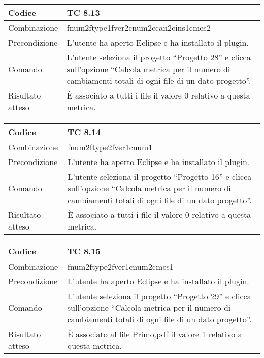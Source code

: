 \begin{table}[ht]
\begin{tabular}{|p{3cm}|p{9cm}|}
\hline
\cellcolor{lightgray}Codice				& TC 8.13								\\
\hline
\cellcolor{lightgray}Combinazione		& fnum2ftype1fver2cnum2ccan2cins1cmes2									\\
\hline
\cellcolor{lightgray}Precondizione		& L'utente ha aperto Eclipse e ha installato il plugin.		\\
\hline
\cellcolor{lightgray}Comando			& L'utente seleziona il progetto ``Progetto 28''  e clicca sull'opzione ``Calcola metrica per il numero di cambiamenti totali di ogni file di un dato progetto''.	\\
\hline
\cellcolor{lightgray}Risultato atteso	& È associato a tutti i file il valore 0 relativo a questa metrica.\\
\hline
\end{tabular}
\end{table}

\begin{table}[ht]
\begin{tabular}{|p{3cm}|p{9cm}|}
\hline
\cellcolor{lightgray}Codice				& TC 8.14								\\
\hline
\cellcolor{lightgray}Combinazione		& fnum2ftype2fver1cnum1									\\
\hline
\cellcolor{lightgray}Precondizione		& L'utente ha aperto Eclipse e ha installato il plugin.		\\
\hline
\cellcolor{lightgray}Comando			& L'utente seleziona il progetto ``Progetto 16''  e clicca sull'opzione ``Calcola metrica per il numero di cambiamenti totali di ogni file di un dato progetto''.	\\
\hline
\cellcolor{lightgray}Risultato atteso	& È associato a tutti i file il valore 0 relativo a questa metrica.\\
\hline
\end{tabular}
\end{table}

\begin{table}[ht]
\begin{tabular}{|p{3cm}|p{9cm}|}
\hline
\cellcolor{lightgray}Codice				& TC 8.15								\\
\hline
\cellcolor{lightgray}Combinazione		& fnum2ftype2fver1cnum2cmes1									\\
\hline
\cellcolor{lightgray}Precondizione		& L'utente ha aperto Eclipse e ha installato il plugin.		\\
\hline
\cellcolor{lightgray}Comando			& L'utente seleziona il progetto ``Progetto 29''  e clicca sull'opzione ``Calcola metrica per il numero di cambiamenti totali di ogni file di un dato progetto''.	\\
\hline
\cellcolor{lightgray}Risultato atteso	& È associato al file Primo.pdf il valore 1 relativo a questa metrica.\\
\hline
\end{tabular}
\end{table}

